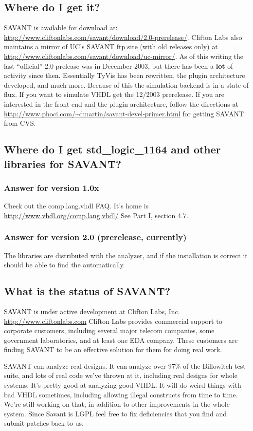 \documentclass[11pt]{article}
\begin{document}
\subsection{Where do I get it?}
SAVANT is available for download at:
\url{http://www.cliftonlabs.com/savant/download/2.0-prerelease/}. Clifton
Labs also maintains a mirror of UC's SAVANT ftp site (with old releases
only) at \url{http://www.cliftonlabs.com/savant/download/uc-mirror/}.  As
of this writing the last ``official'' 2.0 prelease was in December 2003,
but there has been a {\bf lot} of activity since then.  Essentially TyVis
has been rewritten, the plugin architecture developed, and much more.
Because of this the simulation backend is in a state of flux.  If you want
to simulate VHDL get the 12/2003 prerelease.  If you are interested in the
front-end and the plugin architecture, follow the directions at
\url{http://www.phoci.com/~dmartin/savant-devel-primer.html} for getting
SAVANT from CVS.

\subsection{Where do I get std\_logic\_1164 and other libraries for
SAVANT?}
\subsubsection{Answer for version 1.0x}
Check out the comp.lang.vhdl FAQ. It's home is
\url{http://www.vhdl.org/comp.lang.vhdl/} See Part I, section 4.7.
\subsubsection{Answer for version 2.0 (prerelease, currently)}
The libraries are distributed with the analyzer, and if the installation is
correct it should be able to find the automatically.

\subsection{What is the status of SAVANT?}\label{status_section}
SAVANT is under active development at Clifton Labs, Inc.
\url{http://www.cliftonlabs.com}  Clifton Labs provides commercial support
to corporate customers, including several major telecom companies, some
government laboratories, and at least one EDA company.  These customers are
finding SAVANT to be an effective solution for them for doing real work.

SAVANT can analyze real designs. It can analyze over 97\% of the Billowitch
test suite, and lots of real code we've thrown at it, including real
designs for whole systems. It's pretty good at analyzing good VHDL. It will
do weird things with bad VHDL sometimes, including allowing illegal
constructs from time to time. We're still working on that, in addition to
other improvements in the whole system.  Since Savant is LGPL feel free to
fix deficiencies that you find and submit patches back to us.
\end{document}
